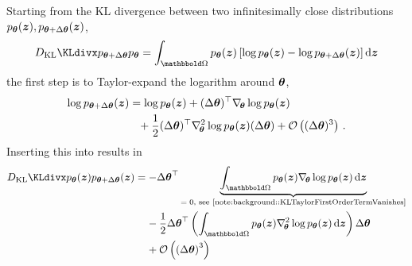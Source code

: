 Starting from the KL divergence between two infinitesimally close
distributions $p_{{\bm{\theta}}}({\bm{z}}), p_{{\bm{\theta}} + \Delta{\bm{\theta}}}({\bm{z}})$,
\begin{align}
  \label{eq:background::KLDivergenceTaylor}
  \KLdiv{p_{\vtheta + \Delta \vtheta}}{p_{\vtheta}}
  =
  \int_{\sOmega} p_{\vtheta}(\vz)
  \left[
  \log p_{\vtheta}(\vz) - \log p_{\vtheta + \Delta \vtheta}(\vz)
  \right]
  \diff\vz
\end{align}
the first step is to Taylor-expand the logarithm around ${\bm{\theta}}$,
\begin{align*}
  \log p_{{\bm{\theta}}+\Delta {\bm{\theta}}}({\bm{z}})
  &=
    \log p_{{\bm{\theta}}}({\bm{z}})
    +
    ({\Delta {\bm{\theta}}})^{\top} \nabla_{\!{{\bm{\theta}}}} \log p_{{\bm{\theta}}}({\bm{z}})
  \\&\phantom{= }
  +
  \frac{1}{2} ({\Delta {\bm{\theta}}})^{\top} \nabla_{\!{{\bm{\theta}}}}^{2} \log p_{{\bm{\theta}}}({\bm{z}}) (\Delta {\bm{\theta}})
  + {\mathcal{O}}\left((\Delta{\bm{\theta}})^3\right)\,.
\end{align*}
Inserting this into  results in
%
%
\begin{align*}
  \KLdiv{p_{\vtheta}(\vz)}{p_{\vtheta + \Delta \vtheta}(\vz)}
  &=
    - {\Delta \vtheta}^{\top}
    \underbrace{
    \int_{\sOmega} p_{\vtheta}(\vz)
    \grad{\vtheta} \log p_{\vtheta}(\vz)
    \,\diff\vz}_{\text{$=0$, see \Cref{note:background::KLTaylorFirstOrderTermVanishes}}}
  \\
  &\phantom{= }\
    -\frac{1}{2}{\Delta \vtheta}^{\top}
    \left(
    \int_{\sOmega} p_{\vtheta}(\vz)
    \gradsquared{\vtheta} \log p_{\vtheta}(\vz)
    \,\diff\vz
    \right)
    \Delta \vtheta
  \\
  &\phantom{= }\
    + \gO\left({(\Delta\vtheta)}^3\right)
\end{align*}
